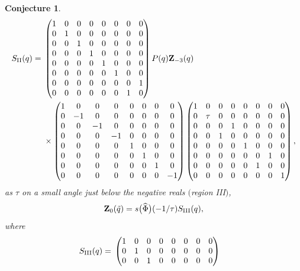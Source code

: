 \documentclass[pdftex]{sigma}
\numberwithin{equation}{section}
\newtheorem{Conjecture}[Theorem]{Conjecture}
\def\tq{\tilde{q}}
\def\Phih{\widehat{\Phi}}
\def\tq{\tilde{q}}
\begin{document}
\begin{Conjecture}
\begin{align*}
S_{\rm II}(q) ={}&\begin{pmatrix}
 1 & 0 & 0 & 0 & 0 & 0 & 0 & 0\\
 0 & 1 & 0 & 0 & 0 & 0 & 0 & 0\\
 0 & 0 & 1 & 0 & 0 & 0 & 0 & 0\\
 0 & 0 & 0 & 1 & 0 & 0 & 0 & 0\\
 0 & 0 & 0 & 0 & 1 & 0 & 0 & 0\\
 0 & 0 & 0 & 0 & 0 & 1 & 0 & 0\\
 0 & 0 & 0 & 0 & 0 & 0 & 0 & 1\\
 0 & 0 & 0 & 0 & 0 & 0 & 1 & 0
\end{pmatrix}P(q)\mathbf{Z}_{-3}(q)\\
&\times
\begin{pmatrix}
 1 & 0 & 0 & 0 & 0 & 0 & 0 & 0\\
 0 & -1 & 0 & 0 & 0 & 0 & 0 & 0\\
 0 & 0 & -1 & 0 & 0 & 0 & 0 & 0\\
 0 & 0 & 0 & -1 & 0 & 0 & 0 & 0\\
 0 & 0 & 0 & 0 & 1 & 0 & 0 & 0\\
 0 & 0 & 0 & 0 & 0 & 1 & 0 & 0\\
 0 & 0 & 0 & 0 & 0 & 0 & 1 & 0\\
 0 & 0 & 0 & 0 & 0 & 0 & 0 & -1
\end{pmatrix}
\begin{pmatrix}
 1 & 0 & 0 & 0 & 0 & 0 & 0 & 0\\
 0 & \tau & 0 & 0 & 0 & 0 & 0 & 0\\
 0 & 0 & 0 & 1 & 0 & 0 & 0 & 0\\
 0 & 0 & 1 & 0 & 0 & 0 & 0 & 0\\
 0 & 0 & 0 & 0 & 1 & 0 & 0 & 0\\
 0 & 0 & 0 & 0 & 0 & 0 & 1 & 0\\
 0 & 0 & 0 & 0 & 0 & 1 & 0 & 0\\
 0 & 0 & 0 & 0 & 0 & 0 & 0 & 1
\end{pmatrix},
\end{align*}
as $\tau$ on a small angle just below the negative reals $($region {\rm III}$)$,
\[
\mathbf{Z}_{0}(\tq) =s\bigl(\Phih\bigr)(-1/\tau)S_{\rm III}(q),
\]
where
\begin{align*}
S_{\rm III}(q) ={} &\begin{pmatrix}
 1 & 0 & 0 & 0 & 0 & 0 & 0 & 0\\
 0 & 1 & 0 & 0 & 0 & 0 & 0 & 0\\
 0 & 0 & 1 & 0 & 0 & 0 & 0 & 0\\

\end{pmatrix}
\end{align*}
\end{Conjecture}
\end{document}
